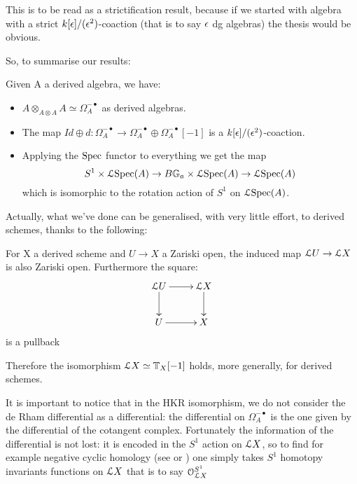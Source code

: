 \begin{refsection}
\begin{remark}
This is to be read as a strictification result, because if we started with algebra with a strict $k[\epsilon]/(\epsilon^2)$-coaction (that is to say $\epsilon$ dg algebras) the thesis would be
obvious.
\end{remark}

So, to summarise our results:

\begin{theorem} Given A a derived algebra, we have:
\begin{itemize}
 \item $A\otimes_{A\otimes A}A\simeq \Omega_A^{-\bullet}$ as derived algebras.
 \item The map $Id\oplus d:\Omega_A^{-\bullet}\to\Omega_A^{-\bullet}\oplus \Omega_A^{-\bullet}[-1]$ is a
 $k[\epsilon]/(\epsilon^2)$-coaction.
\item Applying the $\mathrm{Spec}$ functor to everything we get the map $$S^1\times \mathcal{L}\mathrm{Spec}(A)\to B\mathbb{G}_a\times \mathcal{L} \mathrm{Spec}(A)\to\mathcal{L}\mathrm{Spec}(A)$$ which is isomorphic to
the rotation action of $S^1$ on $\mathcal{L} \mathrm{Spec}(A)$.
\end{itemize}
\end{theorem}

Actually, what we've done can be generalised, with very little effort, to derived schemes, thanks to the following:

\begin{proposition} \cite{Be-Na}
For X a derived scheme and $U\to X$ a Zariski open, the induced map $\mathcal{L} U\to \mathcal{L} X$
is also Zariski open. Furthermore the square:
\begin{displaymath}
\xymatrix{
\L U \ar[r] \ar[d] &  \L X \ar[d]\\
 U \ar[r] & X\\
}
\end{displaymath}
is a pullback
\end{proposition}

Therefore the isomorphism $\mathcal{L} X\simeq \mathbb{T}_X[-1]$ holds, more generally, for derived schemes.

\begin{remark}
It is important to notice that in the HKR isomorphism, we do not consider the de Rham differential as a differential: the differential on $\Omega_A^{-\bullet}$ is the one
given by the differential of the cotangent complex. Fortunately the information of the differential is not lost: it is encoded in the $S^1$ action on $\mathcal{L} X$, so to
find for example negative cyclic homology (see \cite{connes} or \cite{shiftedsymplectic}) one simply takes $S^1$ homotopy invariants functions on $\mathcal{L} X$ that is to say
$\mathcal{O}_{\mathcal{L} X}^{S^1}$
\end{remark}

\nocite{to3, ToVedeRham}
\printbibliography[heading = local]

\end{refsection}
